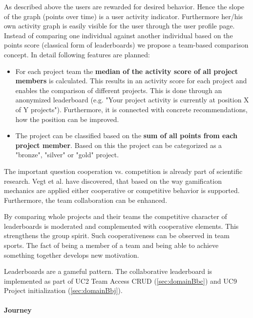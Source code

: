 As described above the users are rewarded for desired behavior. Hence the slope of the graph (points over time) is a user activity indicator. Furthermore her/his own activity graph is easily visible for the user through the user profile page.
Instead of comparing one individual against another individual based on the points score (classical form of leaderboards) we propose a team-based comparison concept. 
In detail following features are planned:
\begin{itemize}
	\item For each project team the \textbf{median of the activity score of all project members} is calculated. This results in an activity score for each project and enables the comparison of different projects. This is done through an anonymized leaderboard (e.g. "Your project activity is currently at position X of Y projects"). Furthermore, it is connected with concrete recommendations, how the position can be improved.
	\item The project can be classified based on the \textbf{sum of all points from each project member}. Based on this the project can be categorized as a "bronze", "silver" or "gold" project.
\end{itemize}

The important question cooperation vs. competition is already part of scientific research. Vegt et al. \cite{vegtDesigningGamificationGuide2015} have discovered, that based on the way gamification mechanics are applied either cooperative or competitive behavior is supported. Furthermore, the team collaboration can be enhanced.

By comparing whole projects and their teams the competitive character of leaderboards is moderated and complemented with cooperative elements. This strengthens the group spirit. Such cooperativeness can be observed in team sports. The fact of being a member of a team and being able to achieve something together develops new motivation.

Leaderboards are a gameful pattern. 
The collaborative leaderboard is implemented as part of \ac{UC}2 Team Access CRUD (\ref{sec:domainBbc}) and \ac{UC}9 Project initialization (\ref{sec:domainBbj}).

\paragraph*{Journey}

